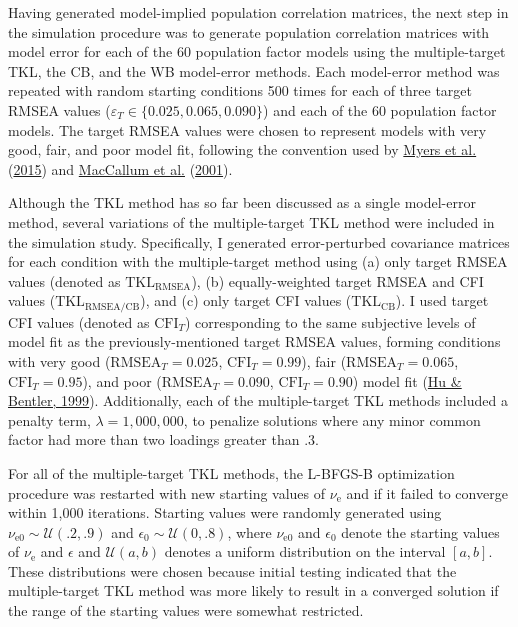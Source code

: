 \documentclass[11pt]{umnthesis}
\begin{document}
Having generated model-implied population correlation matrices, the next step in the simulation procedure was to generate population correlation matrices with model error for each of the 60 population factor models using the multiple-target TKL, the CB, and the WB model-error methods. Each model-error method was repeated with random starting conditions 500 times for each of three target RMSEA values (\(\varepsilon_T \in \{0.025, 0.065, 0.090\}\)) and each of the 60 population factor models. The target RMSEA values were chosen to represent models with very good, fair, and poor model fit, following the convention used by \protect\hyperlink{ref-myers2015a}{Myers et al.} (\protect\hyperlink{ref-myers2015a}{2015}) and \protect\hyperlink{ref-maccallum2001}{MacCallum et al.} (\protect\hyperlink{ref-maccallum2001}{2001}).

Although the TKL method has so far been discussed as a single model-error method, several variations of the multiple-target TKL method were included in the simulation study. Specifically, I generated error-perturbed covariance matrices for each condition with the multiple-target method using (a) only target RMSEA values (denoted as \(\textrm{TKL}_{\textrm{RMSEA}}\)), (b) equally-weighted target RMSEA and CFI values (\(\textrm{TKL}_{\textrm{RMSEA/CB}}\)), and (c) only target CFI values (\(\textrm{TKL}_{\textrm{CB}}\)). I used target CFI values (denoted as \(\textrm{CFI}_T\)) corresponding to the same subjective levels of model fit as the previously-mentioned target RMSEA values, forming conditions with very good (\(\textrm{RMSEA}_T = 0.025\), \(\textrm{CFI}_T = 0.99\)), fair (\(\textrm{RMSEA}_T = 0.065\), \(\textrm{CFI}_T = 0.95\)), and poor (\(\textrm{RMSEA}_T = 0.090\), \(\textrm{CFI}_T = 0.90\)) model fit (\protect\hyperlink{ref-hu1999}{Hu \& Bentler, 1999}). Additionally, each of the multiple-target TKL methods included a penalty term, \(\lambda = 1,000,000\), to penalize solutions where any minor common factor had more than two loadings greater than .3.

For all of the multiple-target TKL methods, the L-BFGS-B optimization procedure was restarted with new starting values of \(\nu_\textrm{e}\) and if it failed to converge within 1,000 iterations. Starting values were randomly generated using \(\nu_{\textrm{e}0} \sim \mathcal{U}(.2, .9)\) and \(\epsilon_0 \sim \mathcal{U}(0, .8)\), where \(\nu_{\textrm{e}0}\) and \(\epsilon_0\) denote the starting values of \(\nu_{\textrm{e}}\) and \(\epsilon\) and \(\mathcal{U}(a, b)\) denotes a uniform distribution on the interval \([a, b]\). These distributions were chosen because initial testing indicated that the multiple-target TKL method was more likely to result in a converged solution if the range of the starting values were somewhat restricted.
\end{document}
